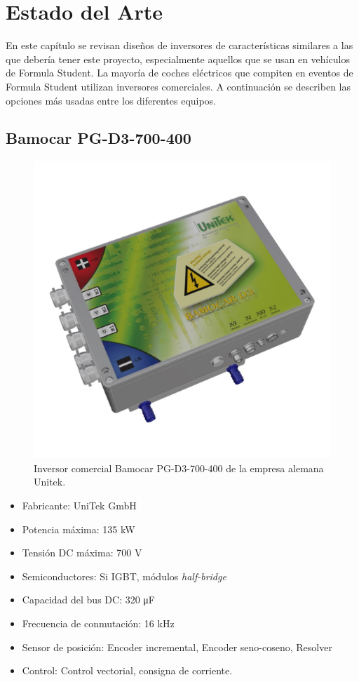 \chapter{Estado del Arte}

En este capítulo se revisan diseños de inversores de características similares a las que debería tener este proyecto, especialmente aquellos que se usan en vehículos de Formula Student. La mayoría de coches eléctricos que compiten en eventos de Formula Student utilizan inversores comerciales. A continuación se describen las opciones más usadas entre los diferentes equipos.

\section{Bamocar PG-D3-700-400}
\begin{figure}[H]
	\centering
	\includegraphics[width=0.7\linewidth]{fig/unitek}
	\caption{Inversor comercial Bamocar PG-D3-700-400 de la empresa alemana Unitek. \cite{unitek_produkte}}
	\label{fig:unitek}
\end{figure}

\begin{itemize}
	\item Fabricante: UniTek GmbH
	\item Potencia máxima: 135 kW
	\item Tensión DC máxima: 700 V
	\item Semiconductores: Si IGBT, módulos \textit{half-bridge}
	\item Capacidad del bus DC: 320 \unit{\micro\farad}
	\item Frecuencia de conmutación: 16 kHz
	\item Sensor de posición: Encoder incremental, Encoder seno-coseno, Resolver
	\item Control: Control vectorial, consigna de corriente.
\end{itemize}

